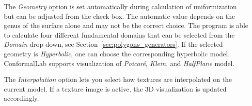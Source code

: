 \documentclass[Thesis.tex]{subfiles}
\begin{document}
The \emph{Geometry} option is set automatically during calculation of uniformization but can be adjusted from the check box. The automatic value depends on the genus of the surface alone and may not be the correct choice. The program is able to calculate four different fundamental domains that can be selected from the \emph{Domain} drop-down, see Section~\ref{sec:polygons_generators}. If the selected geometry is \emph{Hyperbolic}, one can choose the corresponding hyperbolic model. {\sc ConformalLab} supports visualization of \emph{Poicar\'e}, \emph{Klein}, and \emph{HalfPlane} model.

The \emph{Interpolation} option lets you select how textures are interpolated on the current model. 
If a texture image is active, the 3D visualization is updated accordingly.


\subfilebibliography
\end{document}
